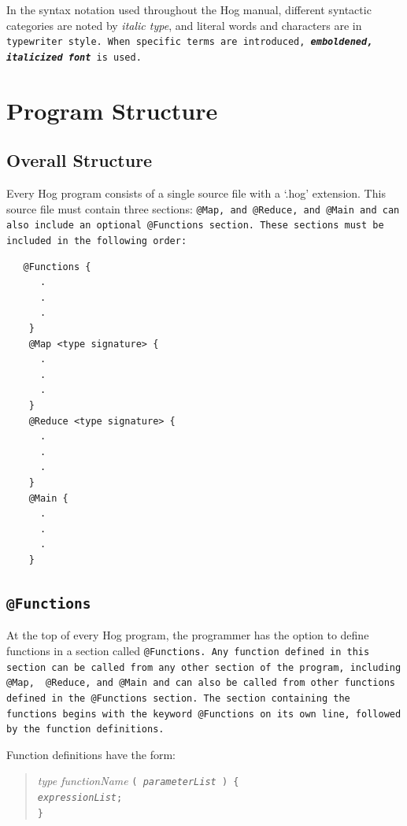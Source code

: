 \documentclass{book}
\begin{document}
In the syntax notation used throughout the Hog manual, different syntactic
categories are noted by \emph{italic type}, and literal words and characters
are in \tt typewriter style\rm. When specific terms are introduced,
\textbf{\emph{emboldened, italicized font}} is used.


\section{Program Structure} %
\label{sec:program_structure}

\subsection{Overall Structure} %
\label{sub:overall_structure}

Every Hog program consists of a single source file with a ‘.hog’ extension. This
source file must contain three sections: \tt @Map\rm, and \tt @Reduce\rm, and
\tt @Main \rm and can also include an optional \tt @Functions \rm section. These
sections must be included in the following order:

\begin{verbatim}
   @Functions {
      .
      .
      .
    }
    @Map <type signature> {
      .
      .
      .
    }
    @Reduce <type signature> {
      .
      .
      .
    }
    @Main {
      .
      .
      .
    }
\end{verbatim}


\subsection{\tt @Functions\rm} %
\label{sub:tt_functionsrm}

At the top of every Hog program, the programmer has the option to define functions
in a section called \tt @Functions\rm. Any function defined in this section can be
called from any other section of the program, including \tt @Map\rm, \tt
@Reduce\rm, and \tt @Main \rm and can also be called from other functions defined
in the \tt @Functions \rm section. The section containing the functions begins
with the keyword \tt @Functions \rm on its own line, followed by the function
definitions.

Function definitions have the form:

\begin{quotation}
  \emph{type functionName} \tt ( \rm \emph{parameterList} \tt ) \{ \rm \\
  \indent \indent \emph{expressionList}; \\
  \indent \tt \}
\end{quotation}
\end{document}
